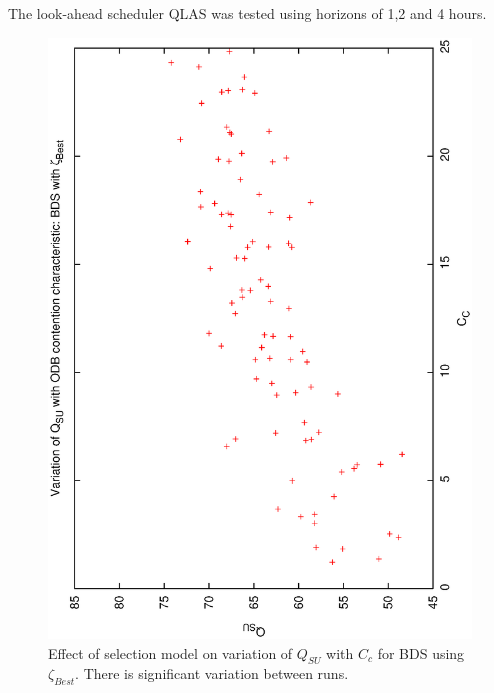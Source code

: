 The look-ahead scheduler QLAS was tested using horizons of 1,2 and 4 hours.

\begin{figure}[h]
 
\begin{center}
 \includegraphics[scale=0.5, angle=-90]{figures/qsucc_best.eps}
 \caption[Effect of selection model on variation of $Q_{SU}$ with $C_c$ for BDS using $\zeta_{Best}$.] 
   {Effect of selection model on variation of $Q_{SU}$ with $C_c$ for BDS using $\zeta_{Best}$. There is significant variation between runs.}
\label{fig:qsucc_best}
\end{center}
\end{figure}

